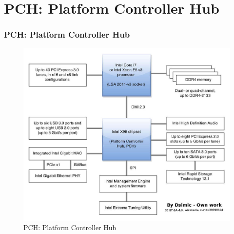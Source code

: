 \documentclass[xcolor=table, notheorems, hyperref={pdfpagelabels=false}]{beamer}
\begin{document}
\section{PCH: Platform Controller Hub}
\begin{frame}
\frametitle{PCH: Platform Controller Hub}
\begin{figure}
\includegraphics[width=0.7\linewidth]{os00-x99-chipset-block-diagram}
\caption{PCH: Platform Controller Hub}
\end{figure}
\end{frame}
\end{document}
